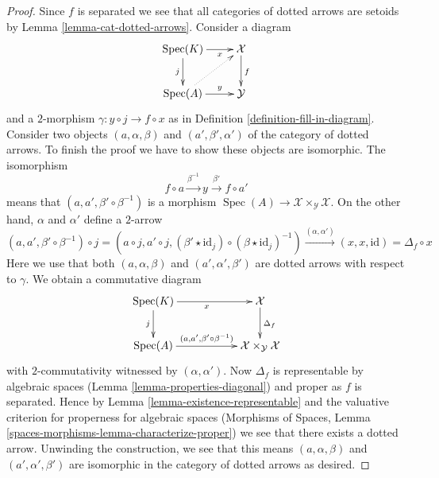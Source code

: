 \documentclass[10pt,a4paper]{amsart}
\theoremstyle{plain}
\theoremstyle{definition}
\theoremstyle{remark}
\numberwithin{equation}{subsection}
\def\Spec{\mathop{\mathrm{Spec}}}
\begin{document}
\begin{proof}
Since $f$ is separated we see that all categories of dotted arrows
are setoids by Lemma \ref{lemma-cat-dotted-arrows}.
Consider a diagram
$$
\xymatrix{
\Spec(K) \ar[r]_-x \ar[d]_j & \mathcal{X} \ar[d]^f \\
\Spec(A) \ar[r]^-y \ar@{..>}[ru] & \mathcal{Y}
}
$$
and a $2$-morphism $\gamma : y \circ j \to f \circ x$ as in
Definition \ref{definition-fill-in-diagram}. Consider two
objects $(a, \alpha, \beta)$ and $(a', \beta', \alpha')$
of the category of dotted arrows. To finish the proof we
have to show these objects are isomorphic. The isomorphism
$$
f \circ a \xrightarrow{\beta^{-1}} y \xrightarrow{\beta'} f \circ a'
$$
means that $(a, a', \beta' \circ \beta^{-1})$ is a morphism
$\Spec(A) \to \mathcal{X} \times_\mathcal{Y} \mathcal{X}$.
On the other hand, $\alpha$ and $\alpha'$ define
a $2$-arrow
$$
(a, a', \beta' \circ \beta^{-1}) \circ j =
(a \circ j, a' \circ j,
(\beta' \star \text{id}_j) \circ (\beta \star \text{id}_j)^{-1})
\xrightarrow{(\alpha, \alpha')} (x, x, \text{id}) = \Delta_f \circ x
$$
Here we use that both $(a, \alpha, \beta)$ and $(a', \alpha', \beta')$
are dotted arrows with respect to $\gamma$.
We obtain a commutative diagram
$$
\xymatrix{
\Spec(K) \ar[d]_j \ar[rr]_x & & \mathcal{X} \ar[d]^{\Delta_f} \\
\Spec(A) \ar[rr]^{(a, a', \beta' \circ \beta^{-1})} & &
\mathcal{X} \times_\mathcal{Y} \mathcal{X}
}
$$
with $2$-commutativity witnessed by $(\alpha, \alpha')$. Now
$\Delta_f$ is representable by algebraic spaces
(Lemma \ref{lemma-properties-diagonal})
and proper as $f$ is separated. Hence by
Lemma \ref{lemma-existence-representable}
and the valuative criterion for properness for algebraic spaces
(Morphisms of Spaces, Lemma \ref{spaces-morphisms-lemma-characterize-proper})
we see that there exists a dotted arrow.
Unwinding the construction, we see that this means
$(a, \alpha, \beta)$ and $(a', \alpha', \beta')$
are isomorphic in the category of dotted arrows as desired.
\end{proof}
\end{document}
